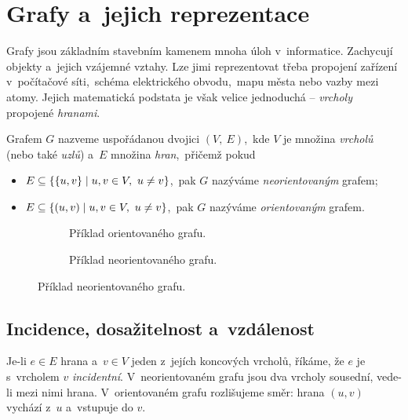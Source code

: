 \section{Grafy a~jejich reprezentace}\label{sec:grafy}

Grafy jsou základním stavebním kamenem mnoha úloh v~informatice. Zachycují objekty a~jejich vzájemné vztahy. Lze jimi reprezentovat třeba propojení zařízení v~počítačové síti,~schéma elektrického obvodu,~mapu města nebo vazby mezi atomy. Jejich matematická podstata je však velice jednoduchá -- \emph{vrcholy} propojené \emph{hranami}.

\begin{definition}[Graf]
    Grafem $G$ nazveme uspořádanou dvojici $(V,~E)$,~kde $V$ je množina \emph{vrcholů} (nebo také \emph{uzlů}) a~$E$ množina \emph{hran},~přičemž pokud
    \begin{itemize}
        \item $E\subseteq\left\{\left\{u,v\right\}\mid u,v\in V,~u\neq v\right\}$,~pak $G$ nazýváme \emph{neorientovaným} grafem;
        \item $E\subseteq\left\{(u,v)\mid u,v\in V,~u\neq v\right\}$,~pak $G$ nazýváme \emph{orientovaným} grafem.
    \end{itemize}
\end{definition}

\begin{figure}[ht]
    \centering
    \begin{subfigure}{6.5cm}
        \centering
        
        \caption{Příklad orientovaného grafu.}
        \label{fig:graf_priklad1}
    \end{subfigure}
    \qquad
    \begin{subfigure}{6.5cm}
        \centering
        
        \caption{Příklad neorientovaného grafu.}
        \label{fig:graf_priklad2}
    \end{subfigure}
\end{figure}

\subsection{Incidence, dosažitelnost a~vzdálenost}

Je-li \(e\in E\) hrana a~\(v\in V\) jeden z~jejích koncových vrcholů, říkáme, že \(e\) je s~vrcholem \(v\) \emph{incidentní}. V~neorientovaném grafu jsou dva vrcholy sousední, vede-li mezi nimi hrana. V~orientovaném grafu rozlišujeme směr: hrana \((u,v)\) vychází z~\(u\) a~vstupuje do \(v\).

